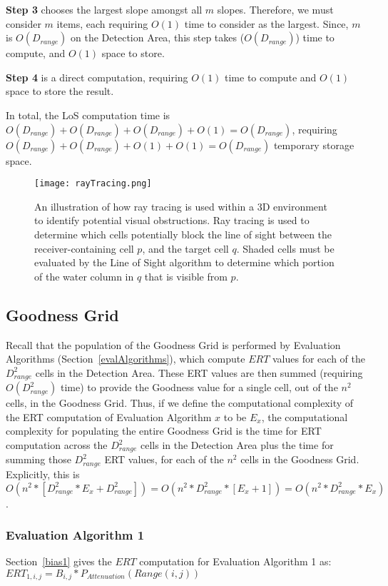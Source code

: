 \noindent\textbf{Step 3} chooses the largest slope amongst all $m$ slopes.  Therefore, we must consider $m$ items, each requiring $O(1)$ time to consider as the largest.  Since, $m$ is $O(D_{range})$ on the Detection Area, this step takes ($O(D_{range})$) time to compute, and $O(1)$ space to store.  \newline

\noindent\textbf{Step 4} is a direct computation, requiring $O(1)$ time to compute and $O(1)$ space to store the result.\newline

In total, the LoS computation time is $O(D_{range}) + O(D_{range}) + O(D_{range}) + O(1) = O(D_{range})$, requiring $O(D_{range}) + O(D_{range}) + O(1) + O(1) = O(D_{range})$ temporary storage space.
\begin{figure}[ht]
	\label{rayTracingImg}
	\centering
	\texttt{[image: rayTracing.png]}
	\caption{An illustration of how ray tracing is used within a 3D environment to identify potential visual obstructions.  Ray tracing is used to determine which cells potentially block the line of sight between the receiver-containing cell $p$, and the target cell $q$.  Shaded cells must be evaluated by the Line of Sight algorithm to determine which portion of the water column in $q$ that is visible from $p$. \cite{Akbarzadeh2013}}
\end{figure}

\subsection{Goodness Grid}
Recall that the population of the Goodness Grid is performed by Evaluation Algorithms (Section~\ref{evalAlgorithms}), which compute $ERT$ values for each of the $D_{range}^2$ cells in the Detection Area.  These ERT values are then summed (requiring $O(D_{range}^2)$  time) to provide the Goodness value for a single cell, out of the $n^2$ cells, in the Goodness Grid.  Thus, if we define the computational complexity of the ERT computation of Evaluation Algorithm $x$ to be $E_x$, the computational complexity for populating the entire Goodness Grid is the time for ERT computation across the $D_{range}^2$ cells in the Detection Area plus the time for summing those $D_{range}^2$ ERT values, for each of the $n^2$ cells in the Goodness Grid.  Explicitly, this is $O(n^2 * [D_{range}^2* E_x + D_{range}^2]) = O(n^2 * D_{range}^2 * [E_x + 1]) = O(n^2 * D_{range}^2 * E_x)$. 


\subsubsection{Evaluation Algorithm 1}
\label{bigObias1}
Section~\ref{bias1} gives the $ERT$ computation for Evaluation Algorithm 1 as:\newline
$ERT_{1,i,j} = B_{i,j} * P_{Attenuation}(Range(i,j))$

